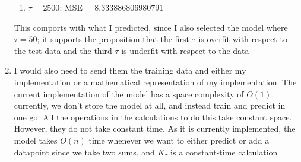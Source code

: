 \documentclass[submit]{harvardml}
\begin{document}
\begin{enumerate}
\begin{enumerate}
        \item $\tau = 2500$: MSE = $8.333886806980791$
    \end{enumerate}
    This comports with what I predicted, since I also selected the model where $\tau = 50$; it supports the proposition that the first $\tau$ is overfit with respect to the test data and the third $\tau$ is underfit with respect to the data 
    \item I would also need to send them the training data and either my implementation or a mathematical representation of my implementation. The current implementation of the model has a space complexity of $O(1)$: currently, we don't store the model at all, and instead train and predict in one go. All the operations in the calculations to do this take constant space. However, they do not take constant time. As it is currently implemented, the model takes $O(n)$ time whenever we want to either predict or add a datapoint since we take two sums, and $K_\tau$ is a constant-time calculation 
\end{enumerate}
\newpage
\end{document}
